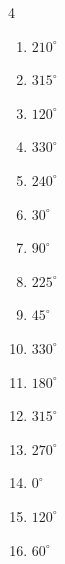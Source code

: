 \begin{multicols}{4}
\begin{enumerate}
  \item $\displaystyle 210^{\circ}$

  \item $\displaystyle 315^{\circ}$

  \item $\displaystyle 120^{\circ}$

  \item $\displaystyle 330^{\circ}$

  \item $\displaystyle 240^{\circ}$

  \item $\displaystyle 30^{\circ}$

  \item $\displaystyle 90^{\circ}$

  \item $\displaystyle 225^{\circ}$

  \item $\displaystyle 45^{\circ}$

  \item $\displaystyle 330^{\circ}$

  \item $\displaystyle 180^{\circ}$
        \phantom{$\displaystyle =\pi$}

  \item $\displaystyle 315^{\circ}$

  \item $\displaystyle 270^{\circ}$

  \item $\displaystyle 0^{\circ}$
        \phantom{$\displaystyle =0$}

\columnbreak %

\resetques

  \item $\displaystyle 120^{\circ}$

  \item $\displaystyle 60^{\circ}$


\end{enumerate}
\end{multicols}
